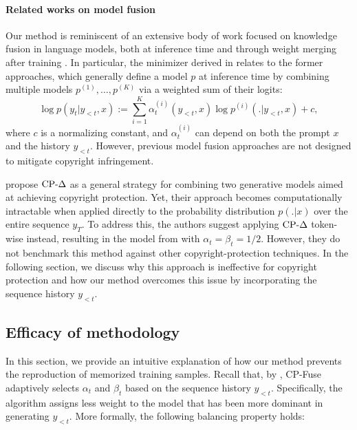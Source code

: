 \paragraph{Related works on model fusion}
Our method is reminiscent of an extensive body of work focused on knowledge fusion in language models, both at inference time \citep{liu2021dexperts, jiang2023llm, gururangan2023scaling, mavromatis2024pack} and through weight merging after training \citep{wortsman2022model, jin2022dataless, hsu2024let, yadav2024ties}. In particular, the minimizer derived in  relates to the former approaches, which generally define a model $p$ at inference time by combining multiple models $p^{(1)}, \dots, p^{(K)}$ via a weighted sum of their logits:
\begin{equation}
\label{eq:fusion}
\log p(y_t | y_{<t}, x) := 
    \sum_{i=1}^K \alpha_t^{(i)}(y_{<t}, x) \log p^{(i)}(. | y_{<t}, x) + c,
\end{equation}
where $c$ is a normalizing constant, and $\alpha_t^{(i)}$ can depend on both the prompt $x$ and the history $y_{<t}$. However, previous model fusion approaches are not designed to mitigate copyright infringement.


\citet{vyas2023provable} propose $\text{CP-}\Delta$ as a general strategy for combining two generative models aimed at achieving copyright protection. Yet, their approach becomes computationally intractable when applied directly to the probability distribution \( p(.| x) \) over the entire sequence \( y_T \). To address this, the authors suggest applying $\text{CP-}\Delta$ token-wise instead, resulting in the model from  with $\alpha_t = \beta_t = 1/2$. However, they do not benchmark this method against other copyright-protection techniques. In the following section, we discuss why this approach is ineffective for copyright protection and how our method overcomes this issue by incorporating the sequence history \( y_{<t} \).






\subsection{Efficacy of methodology}
In this section, we provide an intuitive explanation of how our method prevents the reproduction of memorized training samples.  Recall that, by , CP-Fuse adaptively selects $\alpha_t$ and $\beta_t$ based on the sequence history $y_{<t}$. Specifically, the algorithm assigns less weight to the model that has been more dominant in generating $y_{<t}$. More formally, the following balancing property holds:

